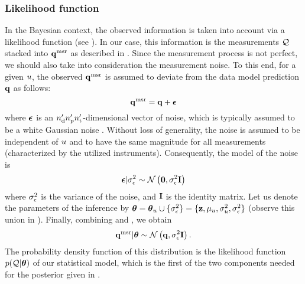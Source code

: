 \subsubsection{Likelihood function}
In the Bayesian context, the observed information is taken into account via a likelihood function (see ).
In our case, this information is the measurements $\mathcal{Q}$ stacked into $\mathbf{q}^{\text{msr}}$ as described in .
Since the measurement process is not perfect, we should also take into consideration the measurement noise.
To this end, for a given $u$, the observed $\mathbf{q}^{\text{msr}}$ is assumed to deviate from the data model prediction $\mathbf{q}$ as follows:
\begin{equation} \elabel{noisy-measurements}
  \vq^\meas = \vq + \vnoise
\end{equation}
where $\boldsymbol\epsilon$ is an ${n_\text{d}'} {n_\text{p}'} {n_\text{t}'}$-dimensional vector of noise, which is typically assumed to be a white Gaussian noise \cite{rasmussen2006, marzouk2009}.
Without loss of generality, the noise is assumed to be independent of $u$ and to have the same magnitude for all measurements (characterized by the utilized instruments).
Consequently, the model of the noise is
\begin{equation} \elabel{noise-model}
  \vnoise | \sigma^2_\noise \sim \gaussian{\vZero}{\sigma^2_\noise \mOne}
\end{equation}
where $\sigma^2_\epsilon$ is the variance of the noise, and $\mathbf{I}$ is the identity matrix.
Let us denote the parameters of the inference by ${\boldsymbol\theta} = {\boldsymbol\theta}_u \cup \{ \sigma_\epsilon^2 \} = \{ \mathbf{z}, \mu_u, \sigma_u^2, \sigma_\epsilon^2 \}$ (observe this union in ).
Finally, combining  and , we obtain
\begin{equation} \elabel{likelihood}
  \vq^\meas | \vparam \sim \gaussian{\vq}{\sigma_\noise^2 \mOne}.
\end{equation}
The probability density function of this distribution is the likelihood function $\f{\QData | \vparam}$ of our statistical model, which is the first of the two components needed for the posterior given in .

